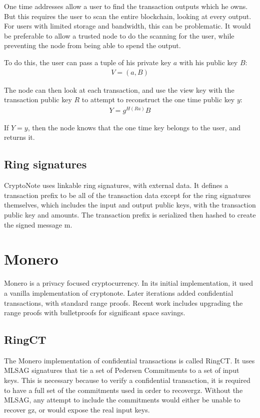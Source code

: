 \documentclass{article}
\begin{document}
One time addresses allow a user to find the transaction outputs which he owns.  But this requires the user to scan the entire blockchain, looking at every output.  For users with limited storage and bandwidth, this can be problematic.  It would be preferable to allow a trusted node to do the scanning for the user, while preventing the node from being able to spend the output.

To do this, the user can pass a tuple of his private key $a$ with his public key $B$:
\begin{align}
  V = (a, B)
\end{align}

The node can then look at each transaction, and use the view key with the transaction public key $R$ to attempt to reconstruct the one time public key $y$:
\begin{align}
  Y = g^{H(Ra)} B
\end{align}

If $Y = y$, then the node knows that the one time key belongs to the user, and returns it.


\subsection{Ring signatures}

CryptoNote uses linkable ring signatures, with external data.  It defines a transaction prefix to be all of the transaction data except for the ring signatures themselves, which includes the input and output public keys, with the transaction public key and amounts.  The transaction prefix is serialized then hashed to create the signed message m.



\section{Monero}

Monero is a privacy focused cryptocurrency.  In its initial implementation, it used a vanilla implementation of cryptonote.  Later iterations added confidential transactions, with standard range proofs.  Recent work includes upgrading the range proofs with bulletproofs for significant space savings.


\subsection{RingCT}

The Monero implementation of confidential transactions is called RingCT.  It uses MLSAG signatures that tie a set of Pedersen Commitments to a set of input keys.  This is necessary because to verify a confidential transaction, it is required to have a full set of the commitments used in order to recovergz.  Without the MLSAG, any attempt to include the commitments would either be unable to recover gz, or would expose the real input keys.
\end{document}
